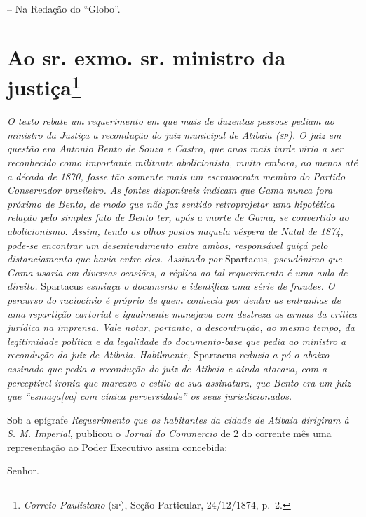 -- Na Redação do ``Globo''.

\chapter{Ao sr. exmo. sr. ministro da justiça\footnote{\emph{Correio Paulistano} (\textsc{sp}), Seção Particular,
  24/12/1874, p.~2.}} %

\begin{didascalia}
\emph{O texto rebate um requerimento em que mais de duzentas pessoas
pediam ao ministro da Justiça a recondução do juiz municipal de Atibaia
(\textsc{sp}). O juiz em questão era Antonio Bento de Souza e Castro, que anos
mais tarde viria a ser reconhecido como importante militante
abolicionista, muito embora, ao menos até a década de 1870, fosse tão
somente mais um escravocrata membro do Partido Conservador brasileiro.
As fontes disponíveis indicam que Gama nunca fora próximo de Bento, de
modo que não faz sentido retroprojetar uma hipotética relação pelo
simples fato de Bento ter, após a morte de Gama, se convertido ao
abolicionismo. Assim, tendo os olhos postos naquela véspera de Natal de
1874, pode-se encontrar um desentendimento entre ambos, responsável
quiçá pelo distanciamento que havia entre eles. Assinado por}
Spartacus\emph{, pseudônimo que Gama usaria em diversas ocasiões, a
réplica ao tal requerimento é uma aula de direito.} Spartacus
\emph{esmiuça o documento e identifica uma série de fraudes. O percurso
do raciocínio é próprio de quem conhecia por dentro as entranhas de uma
repartição cartorial e igualmente manejava com destreza as armas da
crítica jurídica na imprensa. Vale notar, portanto, a descontrução, ao
mesmo tempo, da legitimidade política e da legalidade do documento-base
que pedia ao ministro a recondução do juiz de Atibaia. Habilmente,}
Spartacus \emph{reduzia a pó o abaixo-assinado que pedia a recondução do
juiz de Atibaia e ainda atacava, com a perceptível ironia que marcava o
estilo de sua assinatura, que Bento era um juiz que ``esmaga{[}va{]} com
cínica perversidade'' os seus jurisdicionados.}
\end{didascalia}

Sob a epígrafe \emph{Requerimento que os habitantes da cidade de Atibaia
dirigiram à S. M. Imperial}, publicou o \emph{Jornal do Commercio} de 2
do corrente mês uma representação ao Poder Executivo assim concebida:

Senhor.

